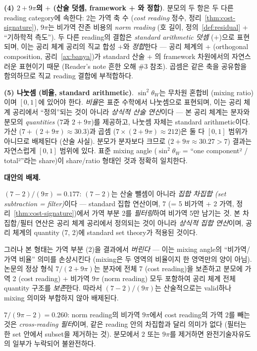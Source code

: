 \documentclass[entropy,article,submit,pdftex,oneauthor]{Definitions/mdpi}
\begin{document}
\textbf{(4) $2 + 9\pi$의 $+$ (산술 덧셈, framework + 와 정합)}. 분모의 두 항은 두 다른 reading category에 속한다: $2$는 가역 축 수 (\emph{cost reading} 정수, 정리~\ref{thm:cost-signature}), $9\pi$는 비가역 잔존 비용의 \emph{norm reading} (호 길이, 정의~\ref{def:residual} + ``기하학적 측도''). 두 다른 reading의 결합은 \emph{standard arithmetic 덧셈} ($+$)으로 표현되며, 이는 공리 체계 공리의 직교 합성 $+$와 \emph{정합}한다 — 공리 체계의 + (orthogonal composition, 공리~\ref{ax:banya})가 standard 산술 + 의 framework 차원에서의 자연스러운 표현이기 때문 (Reader's note 흔한 오해 \#3 참조). 곱셈은 같은 축을 공유함을 함의하므로 직교 reading 결합에 부적합하다.

\textbf{(5) 나눗셈 (비율, standard arithmetic)}. $\sin^2\theta_W$는 무차원 혼합비 (mixing ratio)이며 $[0, 1]$에 있어야 한다. \emph{비율}은 표준 수학에서 나눗셈으로 표현되며, 이는 공리 체계 공리에서 ``정의''되는 것이 아니라 \emph{상식적 산술 연산}이다 — 본 공리 체계는 분자와 분모의 \emph{quantities} ($7$과 $2 + 9\pi$)를 제공하고, 나눗셈 자체는 standard arithmetic이다. 가산 ($7 + (2+9\pi) \approx 30.3$)과 곱셈 ($7 \times (2+9\pi) \approx 212$)은 둘 다 $[0,1]$ 범위가 아니므로 배제된다 (산술 사실). 분모가 분자보다 크므로 ($2 + 9\pi \approx 30.27 > 7$) 결과는 자연스럽게 $[0,1]$ 범위에 있다. 표준 mixing angle ($\sin^2\theta_W$ = ``one component² / total²''라는 share)이 share/ratio 형태인 것과 정확히 일치한다.

\textbf{대안의 배제.}

$(7-2)/(9\pi) = 0.177$: $(7-2)$는 산술 뺄셈이 아니라 \emph{집합 차집합 (set subtraction = filter)}이다 — standard 집합 연산이며, 7 (= 5 비가역 + 2 가역, 정리~\ref{thm:cost-signature})에서 가역 부분 2를 \emph{필터링}하여 비가역 5만 남기는 것. 본 차집합/필터 연산은 공리 체계 공리에서 정의되는 것이 아니라 \emph{상식적 집합 연산}이며, 공리 체계의 quantity (7, 2)에 standard set theory가 적용된 것이다.

그러나 본 형태는 가역 부분 (2)을 결과에서 \emph{버린다} — 이는 mixing angle의 ``비가역/가역 비율'' 의미를 손상시킨다 (mixing은 두 영역의 비율이지 한 영역만의 양이 아님). 논문의 정상 형식 $7/(2+9\pi)$는 분자에 전체 7 (cost reading)을 보존하고 분모에 가역 2 (cost reading) + 비가역 $9\pi$ (norm reading) 모두 포함하여 공리 체계 전체 quantity 구조를 \emph{보존}한다. 따라서 $(7-2)/(9\pi)$는 산술적으로는 valid하나 mixing 의미와 부합하지 않아 배제된다.

$7/(9\pi - 2) = 0.260$: norm reading의 비가역 $9\pi$에서 cost reading의 가역 $2$를 빼는 것은 \emph{cross-reading 필터}이며, 같은 reading 안의 차집합과 달리 의미가 없다 (필터는 한 set 안에서 subset을 제거하는 것). 분모에서 $2$ 또는 $9\pi$를 제거하면 완전기술자유도의 일부가 누락되어 불완전하다.
\end{document}
